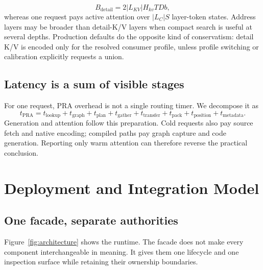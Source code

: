 \documentclass[11pt]{article}
\begin{document}
\begin{equation}
B_{\mathrm{detail}} = 2 |L_{KV}| H_{kv} T D b,
\end{equation}
whereas one request pays active attention over $|L_C|S$ layer-token states.
Address layers may be broader than detail-K/V layers when compact search is
useful at several depths. Production defaults do the opposite kind of
conservatism: detail K/V is encoded only for the resolved consumer profile,
unless profile switching or calibration explicitly requests a union.

\subsection{Latency is a sum of visible stages}

For one request, PRA overhead is not a single routing timer.  We decompose it as
\begin{equation}
t_{\mathrm{PRA}} = t_{\mathrm{lookup}} + t_{\mathrm{graph}} +
t_{\mathrm{plan}} + t_{\mathrm{gather}} + t_{\mathrm{transfer}} +
t_{\mathrm{pack}} + t_{\mathrm{position}} + t_{\mathrm{metadata}}.
\end{equation}
Generation and attention follow this preparation.  Cold requests also pay
source fetch and native encoding; compiled paths pay graph capture and code
generation.  Reporting only warm attention can therefore reverse the practical
conclusion.

\section{Deployment and Integration Model}

\subsection{One facade, separate authorities}

Figure~\ref{fig:architecture} shows the runtime.  The facade does not make every
component interchangeable in meaning.  It gives them one lifecycle and one
inspection surface while retaining their ownership boundaries.
\end{document}
